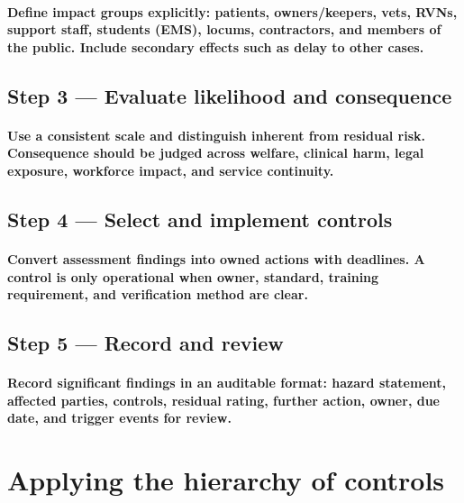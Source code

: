 \paragraph{Define impact groups explicitly: patients, owners/keepers, vets, RVNs, support staff, students (EMS), locums, contractors, and members of the public. Include secondary effects such as delay to other cases.}

\subsection{Step 3 — Evaluate likelihood and consequence}
\paragraph{Use a consistent scale and distinguish inherent from residual risk. Consequence should be judged across welfare, clinical harm, legal exposure, workforce impact, and service continuity.}

\subsection{Step 4 — Select and implement controls}
\paragraph{Convert assessment findings into owned actions with deadlines. A control is only operational when owner, standard, training requirement, and verification method are clear.}

\subsection{Step 5 — Record and review}
\paragraph{Record significant findings in an auditable format: hazard statement, affected parties, controls, residual rating, further action, owner, due date, and trigger events for review.}


\section{Applying the hierarchy of controls}

